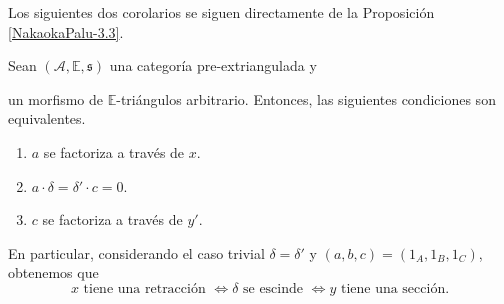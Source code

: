 \documentclass[tesis]{subfiles}
\begin{document}

Los siguientes dos corolarios se siguen directamente de la Proposición \ref{NakaokaPalu-3.3}.

\begin{Coro}\cite[Corollary 3.5]{NakaokaPalu}\label{NakaokaPalu-3.5}
    Sean $(\mathscr{A},\mathbb{E},\mathfrak{s})$ una categoría pre-extriangulada y
    \begin{center}
    \end{center}
    un morfismo de $\mathbb{E}$-triángulos arbitrario. Entonces, las siguientes condiciones son equivalentes.

    \begin{enumerate}[label=(\alph*)]
    
        \item $a$ se factoriza a través de $x$.

        \item $a\cdot\delta = \delta'\cdot c = 0$.

        \item $c$ se factoriza a través de $y'$.
    \end{enumerate}
    En particular, considerando el caso trivial $\delta=\delta'$ y $(a,b,c)=(1_A,1_B,1_C)$, obtenemos que%
\[
x \text{ tiene una retracción } \iff \delta \text{ se escinde } \iff y \text{ tiene una sección.}
\] 
\end{Coro}
\end{document}
